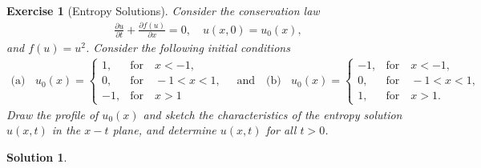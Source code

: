\documentclass[10pt,letterpaper]{article}
\theoremstyle{break}
\newtheorem{exercise}{Exercise}
\newtheorem{mysolution}{Solution}
\newenvironment{solution}{\begin{mysolution}}{\end{mysolution}}
\begin{document}
\begin{exercise}[Entropy Solutions]
    Consider the conservation law 
    \begin{align}
    	\frac{\partial u}{\partial t}
    	+
    	\frac{\partial f(u)}{\partial x}
    	= 0,
    	\quad
    	u(x,0)=u_0(x),
    \end{align}
    and $f(u) = u^2$.
    Consider the following initial conditions
    \begin{align}
    	\text{(a)}
    	\,\,\;\;
    	u_0(x) = 
    	\left\{
    	\begin{array}{cl}
    	1, & \text{for} \quad x<-1,\\
    	0, &\text{for} \quad -1<x< 1,\\
    	-1, &\text{for} \quad x > 1
    	\end{array}
    	\right.
    	\quad
    	\text{and}
    	\quad
    	\text{(b)}
    	\,\,\;\;
    	u_0(x) = 
    	\left\{
    	\begin{array}{cl}
    	-1, & \text{for} \quad x<-1,\\
    	0, &\text{for} \quad -1<x < 1, \\
    	1, &\text{for} \quad x > 1.
    	\end{array}
    	\right.
    \end{align}
    Draw the profile of $u_0(x)$ and sketch the characteristics
    of the entropy solution $u(x,t)$ in the $x-t$ plane, and
    determine $u(x,t)$ for all $t > 0$.
\end{exercise}

\begin{solution}
    
\end{solution}
\end{document}
